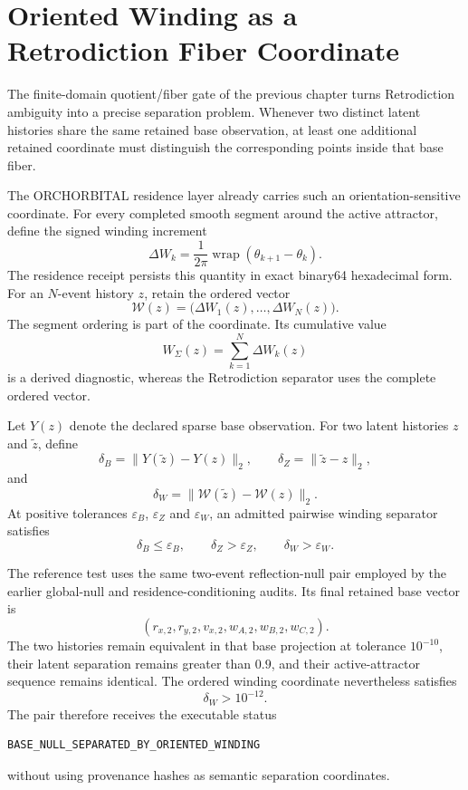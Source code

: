 \chapter{Oriented Winding as a Retrodiction Fiber Coordinate}
\label{chap:oriented-winding-fiber}

The finite-domain quotient/fiber gate of the previous chapter turns Retrodiction ambiguity into a precise separation problem.  Whenever two distinct latent histories share the same retained base observation, at least one additional retained coordinate must distinguish the corresponding points inside that base fiber.

The ORCHORBITAL residence layer already carries such an orientation-sensitive coordinate.  For every completed smooth segment around the active attractor, define the signed winding increment
\[
\Delta W_k
=\frac{1}{2\pi}\operatorname{wrap}(\theta_{k+1}-\theta_k).
\]
The residence receipt persists this quantity in exact binary64 hexadecimal form.  For an $N$-event history $z$, retain the ordered vector
\[
\boxed{
\mathcal W(z)
=\bigl(\Delta W_1(z),\ldots,\Delta W_N(z)\bigr).
}
\]
The segment ordering is part of the coordinate.  Its cumulative value
\[
W_{\Sigma}(z)=\sum_{k=1}^{N}\Delta W_k(z)
\]
is a derived diagnostic, whereas the Retrodiction separator uses the complete ordered vector.

Let $Y(z)$ denote the declared sparse base observation.  For two latent histories $z$ and $\widetilde z$, define
\[
\delta_B=\|Y(\widetilde z)-Y(z)\|_2,
\qquad
\delta_Z=\|\widetilde z-z\|_2,
\]
and
\[
\boxed{
\delta_W
=\|\mathcal W(\widetilde z)-\mathcal W(z)\|_2.
}
\]
At positive tolerances $\varepsilon_B$, $\varepsilon_Z$ and $\varepsilon_W$, an admitted pairwise winding separator satisfies
\[
\delta_B\le\varepsilon_B,
\qquad
\delta_Z>\varepsilon_Z,
\qquad
\delta_W>\varepsilon_W.
\]

The reference test uses the same two-event reflection-null pair employed by the earlier global-null and residence-conditioning audits.  Its final retained base vector is
\[
(r_{x,2},r_{y,2},v_{x,2},w_{A,2},w_{B,2},w_{C,2}).
\]
The two histories remain equivalent in that base projection at tolerance $10^{-10}$, their latent separation remains greater than $0.9$, and their active-attractor sequence remains identical.  The ordered winding coordinate nevertheless satisfies
\[
\boxed{
\delta_W>10^{-12}.
}
\]
The pair therefore receives the executable status
\begin{verbatim}
BASE_NULL_SEPARATED_BY_ORIENTED_WINDING
\end{verbatim}
without using provenance hashes as semantic separation coordinates.

